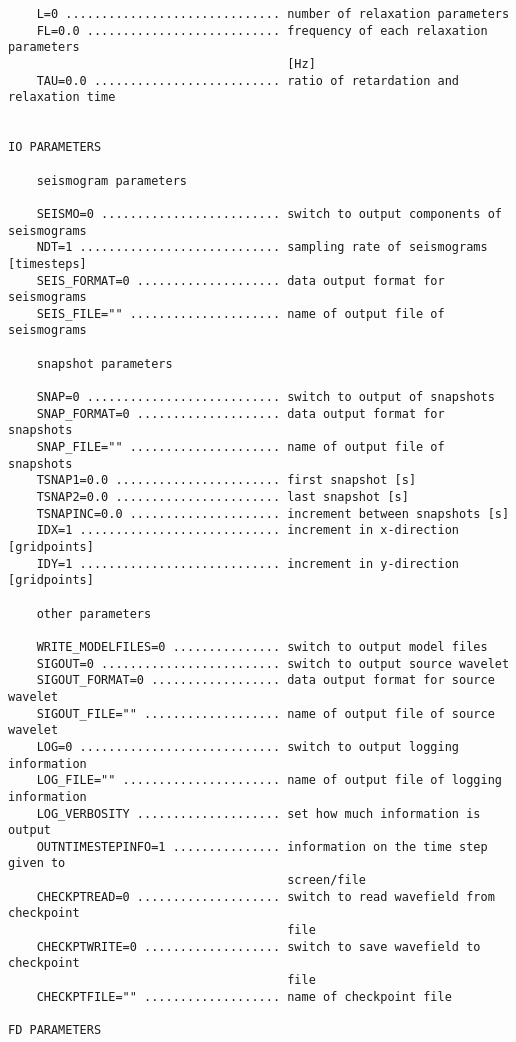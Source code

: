 \begin{verbatim}
    L=0 .............................. number of relaxation parameters
    FL=0.0 ........................... frequency of each relaxation parameters 
                                       [Hz]
    TAU=0.0 .......................... ratio of retardation and relaxation time
    

IO PARAMETERS
    
    seismogram parameters
    
    SEISMO=0 ......................... switch to output components of seismograms
    NDT=1 ............................ sampling rate of seismograms [timesteps]
    SEIS_FORMAT=0 .................... data output format for seismograms
    SEIS_FILE="" ..................... name of output file of seismograms
    
    snapshot parameters
    
    SNAP=0 ........................... switch to output of snapshots
    SNAP_FORMAT=0 .................... data output format for snapshots
    SNAP_FILE="" ..................... name of output file of snapshots
    TSNAP1=0.0 ....................... first snapshot [s]
    TSNAP2=0.0 ....................... last snapshot [s]
    TSNAPINC=0.0 ..................... increment between snapshots [s]
    IDX=1 ............................ increment in x-direction [gridpoints]
    IDY=1 ............................ increment in y-direction [gridpoints]
    
    other parameters
    
    WRITE_MODELFILES=0 ............... switch to output model files
    SIGOUT=0 ......................... switch to output source wavelet
    SIGOUT_FORMAT=0 .................. data output format for source wavelet
    SIGOUT_FILE="" ................... name of output file of source wavelet
    LOG=0 ............................ switch to output logging information
    LOG_FILE="" ...................... name of output file of logging information
    LOG_VERBOSITY .................... set how much information is output
    OUTNTIMESTEPINFO=1 ............... information on the time step given to
                                       screen/file
    CHECKPTREAD=0 .................... switch to read wavefield from checkpoint 
                                       file
    CHECKPTWRITE=0 ................... switch to save wavefield to checkpoint
                                       file
    CHECKPTFILE="" ................... name of checkpoint file

FD PARAMETERS
    

\end{verbatim}
